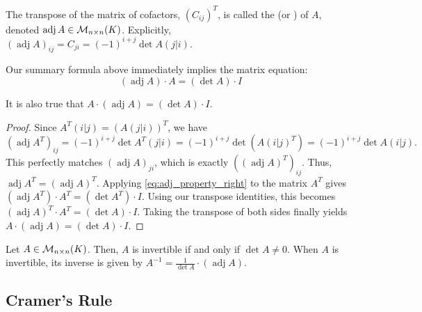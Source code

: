 \begin{definition*}\label{def:classical_adjoint}
  The transpose of the matrix of cofactors, $(C_{ij})^T$, is called the  (or ) of $A$, denoted $\operatorname{adj} A \in \mathcal{M}_{n \times n}(K)$. Explicitly, $(\operatorname{adj} A)_{ij} = C_{ji} = (-1)^{i+j} \det A(j|i)$.
\end{definition*}

Our summary formula above immediately implies the matrix equation:
\begin{equation} \label{eq:adj_property_right}
  (\operatorname{adj} A) \cdot A = (\det A) \cdot I
\end{equation}

\begin{lemma*}\label{lem:adj_property_left}
  It is also true that $A \cdot (\operatorname{adj} A) = (\det A) \cdot I$.
\end{lemma*}

\begin{proof}
  Since $A^T(i|j) = (A(j|i))^T$, we have
  \[(\operatorname{adj} A^T)_{ij} = (-1)^{i+j} \det A^T(j|i) = (-1)^{i+j} \det(A(i|j)^T) = (-1)^{i+j} \det A(i|j).\]
  This perfectly matches $(\operatorname{adj} A)_{ji}$, which is exactly $((\operatorname{adj} A)^T)_{ij}$. Thus, $\operatorname{adj} A^T = (\operatorname{adj} A)^T$.
  Applying \eqref{eq:adj_property_right} to the matrix $A^T$ gives $(\operatorname{adj} A^T) \cdot A^T = (\det A^T) \cdot I$. Using our transpose identities, this becomes $(\operatorname{adj} A)^T \cdot A^T = (\det A) \cdot I$. Taking the transpose of both sides finally yields $A \cdot (\operatorname{adj} A) = (\det A) \cdot I$.
\end{proof}

\begin{theorem}
  \label{thm:inverse_adjoint}
  Let $A \in \mathcal{M}_{n \times n}(K)$. Then, $A$ is invertible if and only if $\det A \neq 0$. When $A$ is invertible, its inverse is given by $A^{-1} = \frac{1}{\det A} \cdot (\operatorname{adj} A)$.
\end{theorem}

\subsection{Cramer's Rule}

